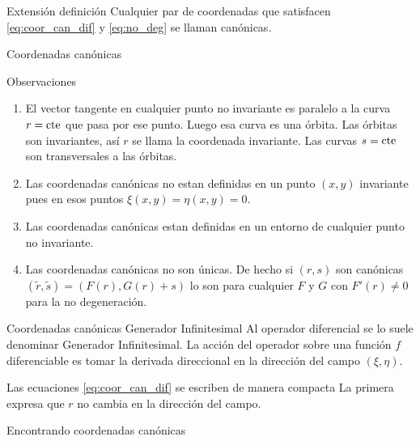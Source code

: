 \documentclass{article}
\renewcommand{\emph}[1]{\textcolor[rgb]{1,0,0}{#1}}
\begin{document}
 {Extensión definición}
Cualquier par de coordenadas que satisfacen \eqref{eq:coor_can_dif} y \eqref{eq:no_deg} se llaman canónicas.







{Coordenadas canónicas}

 {Observaciones}
\begin{enumerate}
\item El vector tangente en cualquier punto no invariante es paralelo a la curva $r=\hbox{cte}$ que pasa por ese punto. Luego esa curva es una órbita. Las órbitas son invariantes, así  $r$ se llama la \emph{coordenada invariante}. Las curvas $s=\hbox{cte}$ son transversales a las órbitas.
\item Las coordenadas canónicas no estan definidas en un punto $(x,y)$ invariante pues en esos puntos $\xi(x,y)=\eta(x,y)=0$.

\item Las coordenadas canónicas estan definidas en un entorno de cualquier   punto no invariante.

\item Las coordenadas canónicas no son únicas. De hecho si $(r,s)$ son canónicas $(\tilde{r},\tilde{s})=(F(r),G(r)+s)$ lo son para cualquier $F$ y $G$ con $F'(r)\neq 0$ para la no degeneración.

\end{enumerate}







{Coordenadas canónicas}
 {Generador Infinitesimal}
Al operador diferencial
se lo suele denominar \emph{Generador Infinitesimal}. La acción del operador sobre una función $f$ diferenciable es tomar la derivada direccional en la dirección del campo $(\xi,\eta)$. 


Las ecuaciones \eqref{eq:coor_can_dif} se escriben de manera compacta
La primera expresa que $r$ no cambia en la dirección del campo.








{Encontrando coordenadas canónicas}
\end{document}
